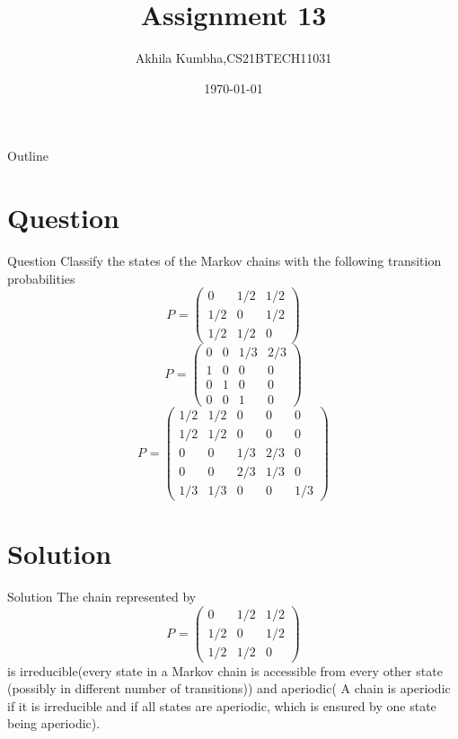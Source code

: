 \documentclass{beamer}
\title{Assignment 13}
\author{Akhila Kumbha,CS21BTECH11031}
\date{\today}
\begin{document}
\begin{frame}
    \titlepage 
\end{frame}

\logo{}

\begin{frame}{Outline}
    \tableofcontents
\end{frame}


\section{Question}
\begin{frame}{Question}
Classify the states of the Markov chains with the following transition probabilities
 \[
  P_{} = 
  \begin{pmatrix}
    0 & 1/2 & 1/2\\
    1/2 & 0 & 1/2\\
    1/2 & 1/2 & 0
  \end{pmatrix}
\]
\[
  P_{} = 
  \begin{pmatrix}
    0 & 0 & 1/3 & 2/3\\
    1 & 0 & 0 & 0 \\
    0 & 1 & 0 & 0\\
    0 & 0 & 1 & 0
  \end{pmatrix}
\]
\[
  P_{} = 
  \begin{pmatrix}
    1/2 & 1/2 & 0 & 0 & 0\\
    1/2 & 1/2 & 0 & 0 & 0\\
    0 & 0 & 1/3 & 2/3 & 0\\
    0 & 0 & 2/3 & 1/3 & 0\\
    1/3 & 1/3 & 0 & 0 & 1/3
  \end{pmatrix}
\]
\end{frame}

\section{Solution}
\begin{frame}{Solution}
The chain represented by 
 \[
  P_{} = 
  \begin{pmatrix}
    0 & 1/2 & 1/2\\
    1/2 & 0 & 1/2\\
    1/2 & 1/2 & 0
  \end{pmatrix}
\] is irreducible(every state in a Markov chain is accessible from every other state (possibly in 
different number of transitions)) and aperiodic( A chain is aperiodic if it is irreducible and if all states are aperiodic, which is ensured by one state being aperiodic).
\end{frame} 
\end{document}
